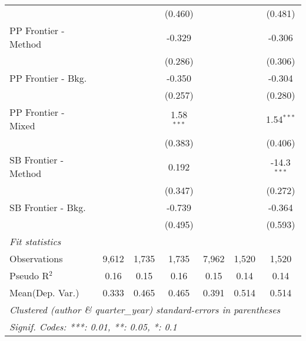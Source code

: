 \begin{tabular}{lcccccc}
                        &                &         & (0.460)      &                &         & (0.481)\\   
   PP Frontier - Method &                &         & -0.329       &                &         & -0.306\\   
                        &                &         & (0.286)      &                &         & (0.306)\\   
   PP Frontier - Bkg.   &                &         & -0.350       &                &         & -0.304\\   
                        &                &         & (0.257)      &                &         & (0.280)\\   
   PP Frontier - Mixed  &                &         & 1.58$^{***}$ &                &         & 1.54$^{***}$\\   
                        &                &         & (0.383)      &                &         & (0.406)\\   
   SB Frontier - Method &                &         & 0.192        &                &         & -14.3$^{***}$\\   
                        &                &         & (0.347)      &                &         & (0.272)\\   
   SB Frontier - Bkg.   &                &         & -0.739       &                &         & -0.364\\   
                        &                &         & (0.495)      &                &         & (0.593)\\   
   \midrule
   \emph{Fit statistics}\\
   Observations         & 9,612          & 1,735   & 1,735        & 7,962          & 1,520   & 1,520\\  
   Pseudo R$^2$         & 0.16           & 0.15    & 0.16         & 0.15           & 0.14    & 0.14\\  
Mean(Dep. Var.) & 0.333 & 0.465 & 0.465 & 0.391 & 0.514 & 0.514 \\
   \midrule \midrule
   \multicolumn{7}{l}{\emph{Clustered (author \& quarter\_year) standard-errors in parentheses}}\\
   \multicolumn{7}{l}{\emph{Signif. Codes: ***: 0.01, **: 0.05, *: 0.1}}\\
\end{tabular}
\par\endgroup
